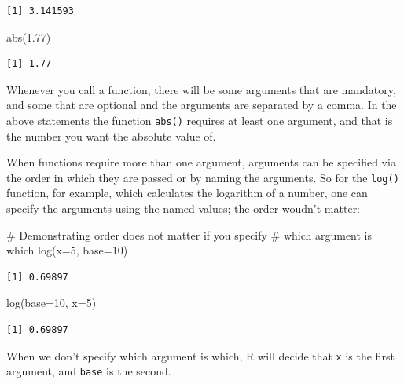 \documentclass[
  letterpaper,
  DIV=11,
  numbers=noendperiod]{scrreprt}
\newenvironment{Shaded}{\begin{snugshade}}{\end{snugshade}}
\newcommand{\AttributeTok}[1]{\textcolor[rgb]{0.40,0.45,0.13}{#1}}
\newcommand{\CommentTok}[1]{\textcolor[rgb]{0.37,0.37,0.37}{#1}}
\newcommand{\DecValTok}[1]{\textcolor[rgb]{0.68,0.00,0.00}{#1}}
\newcommand{\FloatTok}[1]{\textcolor[rgb]{0.68,0.00,0.00}{#1}}
\newcommand{\FunctionTok}[1]{\textcolor[rgb]{0.28,0.35,0.67}{#1}}
\newcommand{\NormalTok}[1]{\textcolor[rgb]{0.00,0.23,0.31}{#1}}
\begin{document}
\begin{verbatim}
[1] 3.141593
\end{verbatim}

\begin{Shaded}
\begin{Highlighting}[]
\FunctionTok{abs}\NormalTok{(}\FloatTok{1.77}\NormalTok{) }
\end{Highlighting}
\end{Shaded}

\begin{verbatim}
[1] 1.77
\end{verbatim}

Whenever you call a function, there will be some arguments that are
mandatory, and some that are optional and the arguments are separated by
a comma. In the above statements the function \texttt{abs()} requires at
least one argument, and that is the number you want the absolute value
of.

When functions require more than one argument, arguments can be
specified via the order in which they are passed or by naming the
arguments. So for the \texttt{log()} function, for example, which
calculates the logarithm of a number, one can specify the arguments
using the named values; the order woudn't matter:

\begin{Shaded}
\begin{Highlighting}[]
\CommentTok{\# Demonstrating order does not matter if you specify}
\CommentTok{\# which argument is which}
\FunctionTok{log}\NormalTok{(}\AttributeTok{x=}\DecValTok{5}\NormalTok{, }\AttributeTok{base=}\DecValTok{10}\NormalTok{)   }
\end{Highlighting}
\end{Shaded}

\begin{verbatim}
[1] 0.69897
\end{verbatim}

\begin{Shaded}
\begin{Highlighting}[]
\FunctionTok{log}\NormalTok{(}\AttributeTok{base=}\DecValTok{10}\NormalTok{, }\AttributeTok{x=}\DecValTok{5}\NormalTok{)}
\end{Highlighting}
\end{Shaded}

\begin{verbatim}
[1] 0.69897
\end{verbatim}

When we don't specify which argument is which, R will decide that
\texttt{x} is the first argument, and \texttt{base} is the second.
\end{document}
